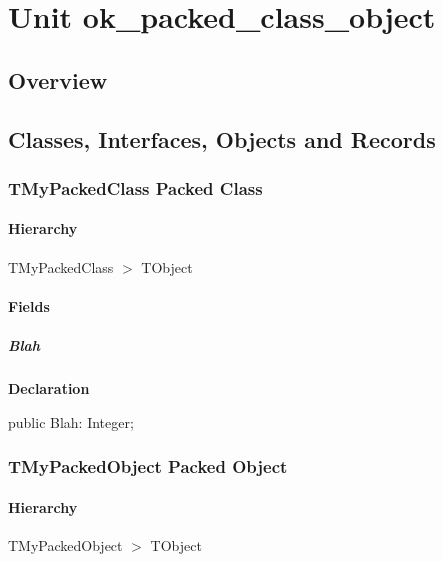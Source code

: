 \documentclass{report}
\begin{document}
\newlength{\tmplength}
\chapter{Unit ok{\_}packed{\_}class{\_}object}
\section{Overview}
\begin{description}
\item[\texttt{\begin{ttfamily}TMyPackedClass\end{ttfamily} Packed Class}]
\item[\texttt{\begin{ttfamily}TMyPackedObject\end{ttfamily} Packed Object}]
\end{description}
\section{Classes, Interfaces, Objects and Records}
\subsection*{TMyPackedClass Packed Class}
\subsubsection*{\large{\textbf{Hierarchy}}\normalsize\hspace{1ex}\hfill}
TMyPackedClass {$>$} TObject
\subsubsection*{\large{\textbf{Fields}}\normalsize\hspace{1ex}\hfill}
\paragraph*{Blah}\hspace*{\fill}

\begin{list}{}{
\setlength{\itemindent}{0cm}
\setlength{\listparindent}{0cm}
\setlength{\leftmargin}{\evensidemargin}
\addtolength{\leftmargin}{\tmplength}
\settowidth{\labelsep}{X}
\addtolength{\leftmargin}{\labelsep}
\setlength{\labelwidth}{\tmplength}
}
\begin{flushleft}
\item[\textbf{Declaration}\hfill]
\begin{ttfamily}
public Blah: Integer;\end{ttfamily}


\end{flushleft}
\end{list}
\subsection*{TMyPackedObject Packed Object}
\subsubsection*{\large{\textbf{Hierarchy}}\normalsize\hspace{1ex}\hfill}
TMyPackedObject {$>$} TObject
\end{document}
